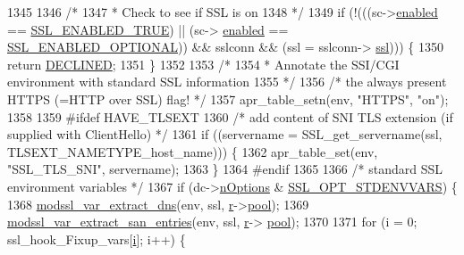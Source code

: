 \begin{DoxyCode}
1345 
1346     \textcolor{comment}{/*}
1347 \textcolor{comment}{     * Check to see if SSL is on}
1348 \textcolor{comment}{     */}
1349     \textcolor{keywordflow}{if} (!(((sc->\hyperlink{structSSLSrvConfigRec_a79b2e4b68e2efe964c8a0d1e715830f3}{enabled} == \hyperlink{group__MOD__SSL__PRIVATE_gga2a6d65d4ff2b1083702c82c09325c299a24df4311d0483627f0e3d9c039bfe08c}{SSL\_ENABLED\_TRUE}) || (sc->
      \hyperlink{structSSLSrvConfigRec_a79b2e4b68e2efe964c8a0d1e715830f3}{enabled} == \hyperlink{group__MOD__SSL__PRIVATE_gga2a6d65d4ff2b1083702c82c09325c299aa61fe8985418a7b4d5a852e7a03303b9}{SSL\_ENABLED\_OPTIONAL})) && sslconn && (ssl = sslconn->
      \hyperlink{structSSLConnRec_acc0257b6ed74d7c6aee8f1a3447df6b5}{ssl}))) \{
1350         \textcolor{keywordflow}{return} \hyperlink{group__APACHE__CORE__DAEMON_ga9eba11ca86461a3ae319311d64682dda}{DECLINED};
1351     \}
1352 
1353     \textcolor{comment}{/*}
1354 \textcolor{comment}{     * Annotate the SSI/CGI environment with standard SSL information}
1355 \textcolor{comment}{     */}
1356     \textcolor{comment}{/* the always present HTTPS (=HTTP over SSL) flag! */}
1357     apr\_table\_setn(env, \textcolor{stringliteral}{"HTTPS"}, \textcolor{stringliteral}{"on"});
1358 
1359 \textcolor{preprocessor}{#ifdef HAVE\_TLSEXT}
1360     \textcolor{comment}{/* add content of SNI TLS extension (if supplied with ClientHello) */}
1361     \textcolor{keywordflow}{if} ((servername = SSL\_get\_servername(ssl, TLSEXT\_NAMETYPE\_host\_name))) \{
1362         apr\_table\_set(env, \textcolor{stringliteral}{"SSL\_TLS\_SNI"}, servername);
1363     \}
1364 \textcolor{preprocessor}{#endif}
1365 
1366     \textcolor{comment}{/* standard SSL environment variables */}
1367     \textcolor{keywordflow}{if} (dc->\hyperlink{structSSLDirConfigRec_a50695711c7c4fca0eddbb421e8620b61}{nOptions} & \hyperlink{group__MOD__SSL__PRIVATE_gabed902986f3f3b5180a713199d2ed3b8}{SSL\_OPT\_STDENVVARS}) \{
1368         \hyperlink{group__MOD__SSL__PRIVATE_gadbed069aea3f28bc8aa6dd97e15cd743}{modssl\_var\_extract\_dns}(env, ssl, \hyperlink{group__APACHE__CORE__CONFIG_ga091cdd45984e865a888a4f8bb8fe107a}{r}->\hyperlink{structrequest__rec_aa0a0c16f9a9ab3901cdb3f3c9c9d83d0}{pool});
1369         \hyperlink{group__MOD__SSL__PRIVATE_gafdb8841b626c0bc44c0583a748c36cec}{modssl\_var\_extract\_san\_entries}(env, ssl, \hyperlink{group__APACHE__CORE__CONFIG_ga091cdd45984e865a888a4f8bb8fe107a}{r}->
      \hyperlink{structrequest__rec_aa0a0c16f9a9ab3901cdb3f3c9c9d83d0}{pool});
1370 
1371         \textcolor{keywordflow}{for} (i = 0; ssl\_hook\_Fixup\_vars[\hyperlink{group__MOD__PROXY_ga38403a0592eb8018a3ad61aef0f7ca2c}{i}]; i++) \{

\end{DoxyCode}

